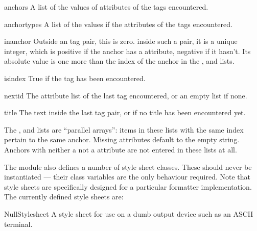 \begin{datadesc}{anchors}
A list of the values of  attributes of the  tags
encountered.
\end{datadesc}

\begin{datadesc}{anchortypes}
A list of the values if the  attributes of the 
tags encountered.
\end{datadesc}

\begin{datadesc}{inanchor}
Outside an  tag pair, this is zero.  inside such a
pair, it is a unique integer, which is positive if the anchor has a
 attribute, negative if it hasn't.  Its absolute value is
one more than the index of the anchor in the ,
 and  lists.
\end{datadesc}

\begin{datadesc}{isindex}
True if the  tag has been encountered.
\end{datadesc}

\begin{datadesc}{nextid}
The attribute list of the last  tag encountered, or
an empty list if none.
\end{datadesc}

\begin{datadesc}{title}
The text inside the last  tag pair, or
 if no title has been encountered yet.
\end{datadesc}

The ,  and  lists
are ``parallel arrays'': items in these lists with the same index
pertain to the same anchor.  Missing attributes default to the empty
string.  Anchors with neither a  not a 
attribute are not entered in these lists at all.

The module also defines a number of style sheet classes.  These should
never be instantiated --- their class variables are the only behaviour
required.  Note that style sheets are specifically designed for a
particular formatter implementation.  The currently defined style
sheets are:

\begin{datadesc}{NullStylesheet}
A style sheet for use on a dumb output device such as an ASCII
terminal.
\end{datadesc}

